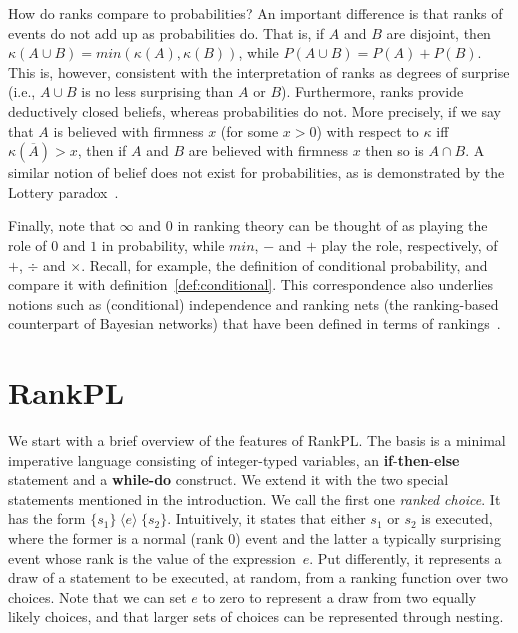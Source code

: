 \documentclass{llncs}
\newcommand{\Rank}[1]{\hspace{3pt} \pmb{\langle} #1 \pmb{\rangle}\hspace{3pt} } %
\begin{document}
How do ranks compare to probabilities?
An important difference is that ranks of events do not add up as probabilities do.
That is, if $A$ and $B$ are disjoint, then $\kappa(A \cup B) = min(\kappa(A), \kappa(B))$, while $P(A \cup B) = P(A) + P(B)$.
This is, however, consistent with the interpretation of ranks as degrees of surprise (i.e., $A \cup B$ is no less surprising than $A$ or $B$).
Furthermore, ranks provide deductively closed beliefs, whereas probabilities do not.
More precisely, if we say that $A$ is believed with firmness $x$ (for some $x > 0$) with respect to $\kappa$ iff $\kappa(\overline A) > x$, 
	then if $A$ and $B$ are believed with firmness $x$ then so is $A \cap B$.
A similar notion of belief does not exist for probabilities, as is demonstrated by the Lottery paradox~\cite{kyburg1961probability}.

Finally, note that $\infty$ and $0$ in ranking theory can be thought of as playing the role of $0$ and $1$ in probability,
	while $min$, $-$ and $+$ play the role, respectively, of $+$, $\div$ and $\times$.
Recall, for example, the definition of conditional probability, and compare it with definition~\ref{def:conditional}.
This correspondence also underlies notions such as (conditional) independence and ranking nets (the ranking-based counterpart of Bayesian networks)
	that have been defined in terms of rankings~\cite{DBLP:books/daglib/0035277}.

\section{RankPL}\label{sec:rpl}

We start with a brief overview of the features of RankPL.
The basis is a minimal imperative language 
	consisting of integer-typed variables, an \textbf{if}-\textbf{then}-\textbf{else} statement and a \textbf{while-do} construct.
We extend it with the two special statements mentioned in the introduction.
We call the first one \emph{ranked choice}.
It has the form
$\{s_1\} \Rank{e} \{s_2\}.$
Intuitively, it states that either $s_1$ or $s_2$ is executed, 
	where the former is a normal (rank 0) event and the latter a typically surprising event whose rank is the value  
	of the expression~$e$.
Put differently, it represents a draw of a statement to be executed, at random, from a ranking function over two choices.
Note that we can set $e$ to zero to represent a draw from two equally likely choices,
	and that larger sets of choices can be represented through nesting.
\end{document}
